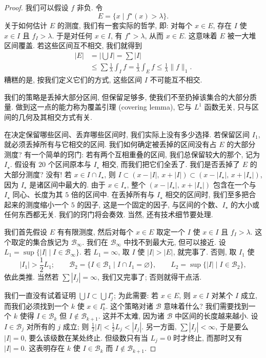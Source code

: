 \begin{proof}
我们可以假设 $f$ 非负. 令
\[
E=\{x \mid f^{\star}(x)>\lambda\}.
\]
关于如何估计 $E$ 的测度, 我们有一套实际的哲学, 即: 对每个 $x\in E$, 存在 $I$ 使 $x\in I$ 且 $f_I>\lambda$. 于是对任何 $x\in I$, 有 $f^{\star}>\lambda$, 从而 $x\in E$. 这意味着 $E$ 被一大堆区间覆盖. 若这些区间互不相交, 我们就得到
\begin{align*}
|E|&=|\bigcup I|=\sum|I| \\
&\leq\sum\frac{1}{\lambda}\int_{I}f=\frac{1}{\lambda}\int_{E}f\leq\frac{1}{\lambda}\|f\|_{1}.
\end{align*}
糟糕的是, 按我们定义它们的方式, 这些区间 $I$ 不可能互不相交.

我们的策略是丢掉大部分区间, 但保留足够多, 使我们不至扔掉该集合的大部分质量. 做到这一点的能力称为覆盖引理 (covering lemma), 它与 $L^{1}$ 函数无关, 只与区间的几何及其相交方式有关.

在决定保留哪些区间、丢弃哪些区间时, 我们实际上没有多少选择. 若保留区间 $I_1$, 就必须丢掉所有与它相交的区间. 我们如何确定被丢掉的区间没有占 $E$ 的大部分测度? 有一个简单的窍门: 若有两个互相重叠的区间, 我们总保留较大的那个, 记为 $I_\star$. 假设有 $20$ 个区间原本与 $I_\star$ 相交, 而我们把它们全丢了. 我们是否丢掉了 $E$ 的大部分测度? 没有! 若 $x\in I\cap I_\star$, 则 $I\subset(x-|I|,\,x+|I|)\subset(x-|I_\star|,\,x+|I_\star|)$, 因为 $I_\star$ 是诸区间中最大的. 由于 $x\in I_\star$, 整个 $(x-|I_\star|,\,x+|I_\star|)$ 包含在一个与 $I_\star$ 同心、长度为其 $5$ 倍的区间中. 在丢掉所有与 $I_\star$ 相交的区间时, 我们至多把合起来的测度缩小一个 $5$ 的因子, 这是一个固定的因子, 与区间的个数、$I_\star$ 的大小或任何东西都无关. 我们的窍门将会奏效. 当然, 还有技术细节要处理.

我们首先假设 $E$ 有有限测度, 然后对每个 $x\in E$ 取定一个 $I$ 使 $x\in I$ 且 $f_I>\lambda$. 这个取定的集合族记为 $\mathcal{B}_\infty$. 我们在 $\mathcal{B}_\infty$ 中找不到最大元, 但可以接近. 设 $L_1=\sup\{|I| \mid I\in\mathcal{B}_\infty\}$. 若 $L_1=\infty$, 取 $I$ 使 $|I|>|E|$, 就完事了. 否则, 取 $I_1$ 使
\[
|I_{1}|>\frac{1}{2}L_{1};\qquad
\mathcal{B}_{2}=\{I\in\mathcal{B}_{1} \mid I\cap I_{1}=\varnothing\},\qquad
L_{2}=\sup\{|I| \mid I\in\mathcal{B}_{2}\},
\]
依此类推. 当然若 $\sum|I_j|=\infty$, 我们又完事了; 否则就得干点活.

我们一直没有试着证明 $\bigcup I\subset\bigcup I_j^{\star}$; 为此需要: 若 $x\in E$, 则 $x\in I$ 对某个 $I$ 成立, 而我们必须找到一个 $k$ 使 $x\in I_k^{\star}$. 这个策略对诸 $\mathcal{B}$ 意味着什么? 我们需要找到一个 $k$ 使得 $I\in\mathcal{B}_k$ 但 $I\notin\mathcal{B}_{k+1}$. 这并不太难, 因为诸 $\mathcal{B}$ 中区间的长度越来越小. 设 $I\in\mathcal{B}_j$ 对所有的 $j$ 成立; 则 $\frac{1}{2}|I|<\frac{1}{2}L_j<|I_j|$. 另一方面, $\sum|I_j|<\infty$, 于是要么 $|I|=0$, 要么该级数在某处终止. 但级数只有当 $L_j=0$ 时才终止, 而那时又有 $|I|=0$. 这表明存在 $k$ 使 $I\in\mathcal{B}_k$ 而 $I\notin\mathcal{B}_{k+1}$.


\end{proof}
